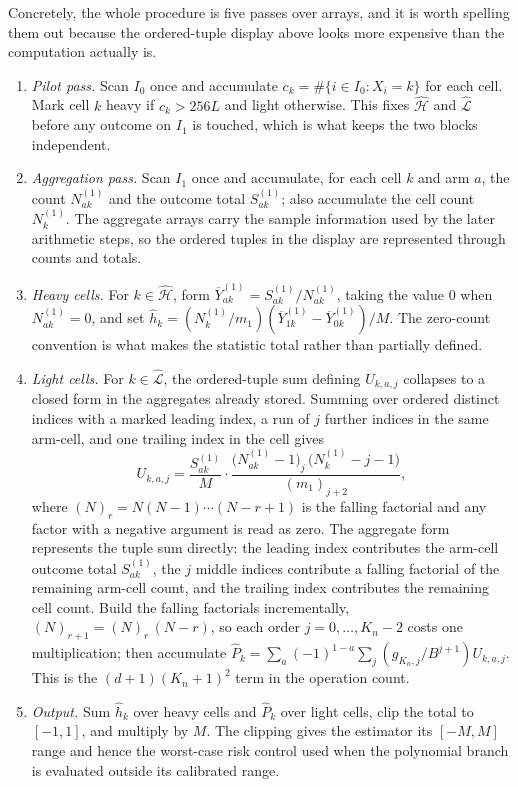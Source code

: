 Concretely, the whole procedure is five passes over arrays, and it is worth spelling them out because the ordered-tuple display above looks more expensive than the computation actually is.
\begin{enumerate}
\item \emph{Pilot pass.} Scan \(I_0\) once and accumulate \(c_k=\#\{i\in I_0:X_i=k\}\) for each cell. Mark cell \(k\) heavy if \(c_k>256L\) and light otherwise. This fixes \(\widehat{\mathcal H}\) and \(\widehat{\mathcal L}\) before any outcome on \(I_1\) is touched, which is what keeps the two blocks independent.
\item \emph{Aggregation pass.} Scan \(I_1\) once and accumulate, for each cell \(k\) and arm \(a\), the count \(N_{ak}^{(1)}\) and the outcome total \(S_{ak}^{(1)}\); also accumulate the cell count \(N_k^{(1)}\). The aggregate arrays carry the sample information used by the later arithmetic steps, so the ordered tuples in the display are represented through counts and totals.
\item \emph{Heavy cells.} For \(k\in\widehat{\mathcal H}\), form \(\overline Y_{ak}^{(1)}=S_{ak}^{(1)}/N_{ak}^{(1)}\), taking the value \(0\) when \(N_{ak}^{(1)}=0\), and set \(\widehat h_k=(N_k^{(1)}/m_1)(\overline Y_{1k}^{(1)}-\overline Y_{0k}^{(1)})/M\). The zero-count convention is what makes the statistic total rather than partially defined.
\item \emph{Light cells.} For \(k\in\widehat{\mathcal L}\), the ordered-tuple sum defining \(U_{k,a,j}\) collapses to a closed form in the aggregates already stored. Summing over ordered distinct indices with a marked leading index, a run of \(j\) further indices in the same arm-cell, and one trailing index in the cell gives
\[
U_{k,a,j}
=
\frac{S_{ak}^{(1)}}{M}\cdot
\frac{\bigl(N_{ak}^{(1)}-1\bigr)_{j}\,\bigl(N_k^{(1)}-j-1\bigr)}{(m_1)_{j+2}},
\]
where \((N)_r=N(N-1)\cdots(N-r+1)\) is the falling factorial and any factor with a negative argument is read as zero. The aggregate form represents the tuple sum directly: the leading index contributes the arm-cell outcome total \(S_{ak}^{(1)}\), the \(j\) middle indices contribute a falling factorial of the remaining arm-cell count, and the trailing index contributes the remaining cell count. Build the falling factorials incrementally, \((N)_{r+1}=(N)_r\,(N-r)\), so each order \(j=0,\ldots,K_n-2\) costs one multiplication; then accumulate \(\widehat P_k=\sum_a(-1)^{1-a}\sum_j (g_{K_n,j}/B^{j+1})U_{k,a,j}\). This is the \((d+1)(K_n+1)^2\) term in the operation count.
\item \emph{Output.} Sum \(\widehat h_k\) over heavy cells and \(\widehat P_k\) over light cells, clip the total to \([-1,1]\), and multiply by \(M\). The clipping gives the estimator its \([-M,M]\) range and hence the worst-case risk control used when the polynomial branch is evaluated outside its calibrated range.
\end{enumerate}
